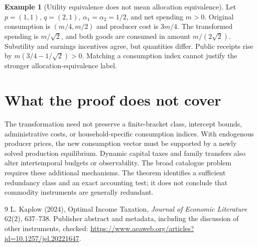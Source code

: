 \documentclass[11pt]{article}
\theoremstyle{definition}
\newtheorem{example}{Example}
\begin{document}
\begin{example}[Utility equivalence does not mean allocation equivalence]
Let $p=(1,1)$, $q=(2,1)$, $\alpha_1=\alpha_2=1/2$, and net spending $m>0$. Original consumption is $(m/4,m/2)$ and producer cost is $3m/4$. The transformed spending is $m/\sqrt2$, and both goods are consumed in amount $m/(2\sqrt2)$. Subutility and earnings incentives agree, but quantities differ. Public receipts rise by $m(3/4-1/\sqrt2)>0$. Matching a consumption index cannot justify the stronger allocation-equivalence label.
\end{example}

\section*{What the proof does not cover}
The transformation need not preserve a finite-bracket class, intercept bounds, administrative costs, or household-specific consumption indices. With endogenous producer prices, the new consumption vector must be supported by a newly solved production equilibrium. Dynamic capital taxes and family transfers also alter intertemporal budgets or observability. The broad catalogue problem requires these additional mechanisms. The theorem identifies a sufficient redundancy class and an exact accounting test; it does not conclude that commodity instruments are generally redundant.
\begin{thebibliography}{9}
 L. Kaplow (2024), Optimal Income Taxation, \emph{Journal of Economic Literature} 62(2), 637--738. Publisher abstract and metadata, including the discussion of other instruments, checked: \url{https://www.aeaweb.org/articles?id=10.1257/jel.20221647}.
\end{thebibliography}
\end{document}
